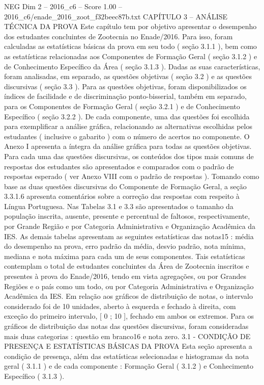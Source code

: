 \begin{textsample}{NEG Dim 2 – 2016\_c6 – Score 1.00 – 2016\_c6/enade\_2016\_zoot\_f32beec87b.txt}  \label{ex:f2_neg_226}
CAPÍTULO 3 – ANÁLISE TÉCNICA DA PROVA Este capítulo tem por objetivo apresentar o desempenho dos estudantes concluintes de Zootecnia no Enade/2016.
Para isso, foram calculadas as estatísticas básicas da prova em seu todo ( seção 3.1.1 ), bem como as estatísticas relacionadas aos Componentes de Formação Geral ( seção 3.1.2 ) e de Conhecimento Específico da Área ( seção 3.1.3 ).
Dadas as suas características, foram analisadas, em separado, as questões objetivas ( seção 3.2 ) e as questões discursivas ( seção 3.3 ).
Para as questões objetivas, foram disponibilizados os índices de facilidade e de discriminação ponto-bisserial, também em separado, para os Componentes de Formação Geral ( seção 3.2.1 ) e de Conhecimento Específico ( seção 3.2.2 ).
De cada componente, uma das questões foi escolhida para exemplificar a análise gráfica, relacionando as alternativas escolhidas pelos estudantes ( inclusive o gabarito ) com o número de acertos no componente.
O Anexo I apresenta a íntegra da análise gráfica para todas as questões objetivas.
Para cada uma das questões discursivas, os conteúdos dos tipos mais comuns de respostas dos estudantes são apresentados e comparados com o padrão de respostas esperado ( ver Anexo VIII com o padrão de respostas ).
Tomando como base as duas questões discursivas do Componente de Formação Geral, a seção 3.3.1.6 apresenta comentários sobre a correção das respostas com respeito à Língua Portuguesa.
Nas Tabelas 3.1 e 3.3 são apresentados o tamanho da população inscrita, ausente, presente e percentual de faltosos, respectivamente, por Grande Região e por Categoria Administrativa e Organização Acadêmica da IES.
As demais tabelas apresentam as seguintes estatísticas das notas15 : média do desempenho na prova, erro padrão da média, desvio padrão, nota mínima, mediana e nota máxima para cada um de seus componentes.
Tais estatísticas contemplam o total de estudantes concluintes da Área de Zootecnia inscritos e presentes à prova do Enade/2016, tendo em vista agregações, ou por Grandes Regiões e o país como um todo, ou por Categoria Administrativa e Organização Acadêmica da IES.
Em relação aos gráficos de distribuição de notas, o intervalo considerado foi de 10 unidades, aberto à esquerda e fechado à direita, com exceção do primeiro intervalo, [ 0 ; 10 ], fechado em ambos os extremos.
Para os gráficos de distribuição das notas das questões discursivas, foram consideradas mais duas categorias : questão em branco16 e nota zero. 3.1 - CONDIÇÃO DE PRESENÇA E ESTATÍSTICAS BÁSICAS DA PROVA Esta seção apresenta a condição de presença, além das estatísticas selecionadas e histogramas da nota geral ( 3.1.1 ) e de cada componente : Formação Geral ( 3.1.2 ) e Conhecimento Específico ( 3.1.3 ).

\end{textsample}
